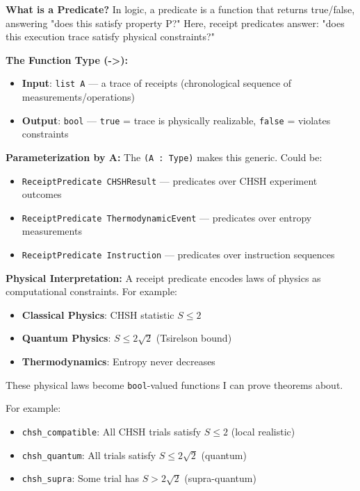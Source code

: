 \textbf{What is a Predicate?} In logic, a predicate is a function that returns true/false, answering "does this satisfy property P?" Here, receipt predicates answer: "does this execution trace satisfy physical constraints?"

\textbf{The Function Type (->):}
\begin{itemize}
    \item \textbf{Input}: \texttt{list A} — a trace of receipts (chronological sequence of measurements/operations)
    \item \textbf{Output}: \texttt{bool} — \texttt{true} = trace is physically realizable, \texttt{false} = violates constraints
\end{itemize}

\textbf{Parameterization by A:} The \texttt{(A : Type)} makes this generic. Could be:
\begin{itemize}
    \item \texttt{ReceiptPredicate CHSHResult} — predicates over CHSH experiment outcomes
    \item \texttt{ReceiptPredicate ThermodynamicEvent} — predicates over entropy measurements
    \item \texttt{ReceiptPredicate Instruction} — predicates over instruction sequences
\end{itemize}

\textbf{Physical Interpretation:} A receipt predicate encodes laws of physics as computational constraints. For example:
\begin{itemize}
    \item \textbf{Classical Physics}: CHSH statistic $S \leq 2$
    \item \textbf{Quantum Physics}: $S \leq 2\sqrt{2}$ (Tsirelson bound)
    \item \textbf{Thermodynamics}: Entropy never decreases
\end{itemize}
These physical laws become \texttt{bool}-valued functions I can prove theorems about.

For example:
\begin{itemize}
    \item \texttt{chsh\_compatible}: All CHSH trials satisfy $S \le 2$ (local realistic)
    \item \texttt{chsh\_quantum}: All trials satisfy $S \le 2\sqrt{2}$ (quantum)
    \item \texttt{chsh\_supra}: Some trial has $S > 2\sqrt{2}$ (supra-quantum)
\end{itemize}

